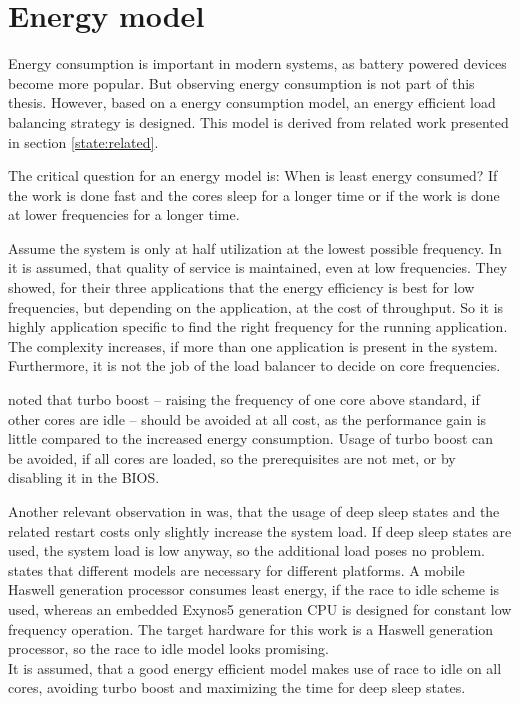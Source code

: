 \section{Energy model}
\label{design:energy}

Energy consumption is important in modern systems, as battery powered devices
become more popular.
But observing energy consumption is not part of this thesis.
However, based on a energy consumption model, an energy efficient load
balancing strategy is designed.
This model is derived from related work presented in section
\ref{state:related}.

The critical question for an energy model is:
When is least energy consumed?
If the work is done fast and the cores sleep for a longer time or if the work
is done at lower frequencies for a longer time.

Assume the system is only at half utilization at the lowest possible frequency.
In \cite{le_sueur_slow_2011} it is assumed, that quality of service is
maintained, even at low frequencies.
They showed, for their three applications that the energy efficiency is best
for low frequencies, but depending on the application, at the cost of
throughput.
So it is highly application specific to find the right frequency for the
running application.
The complexity increases, if more than one application is present in the
system.
Furthermore, it is not the job of the load balancer to decide on core
frequencies.

\citeauthor{le_sueur_slow_2011} noted that turbo boost -- raising the frequency
of one core above standard, if other cores are idle -- should be avoided at
all cost, as the performance gain is little compared to the increased energy
consumption.
Usage of turbo boost can be avoided, if all cores are loaded, so the
prerequisites are not met, or by disabling it in the BIOS.

Another relevant observation in \cite{le_sueur_slow_2011} was, that the usage
of deep sleep states and the related restart costs only slightly increase the
system load.
If deep sleep states are used, the system load is low anyway, so the additional
load poses no problem.
\\

\cite{imes_poet_2015} states that different models are necessary for different
platforms.
A mobile Haswell generation processor consumes least energy, if the race to
idle scheme is used, whereas an embedded Exynos5 generation CPU is designed for
constant low frequency operation.
The target hardware for this work is a Haswell generation processor, so the
race to idle model looks promising.
\\

It is assumed, that a good energy efficient model makes use of race to idle on all
cores, avoiding turbo boost and maximizing the time for deep sleep states.

